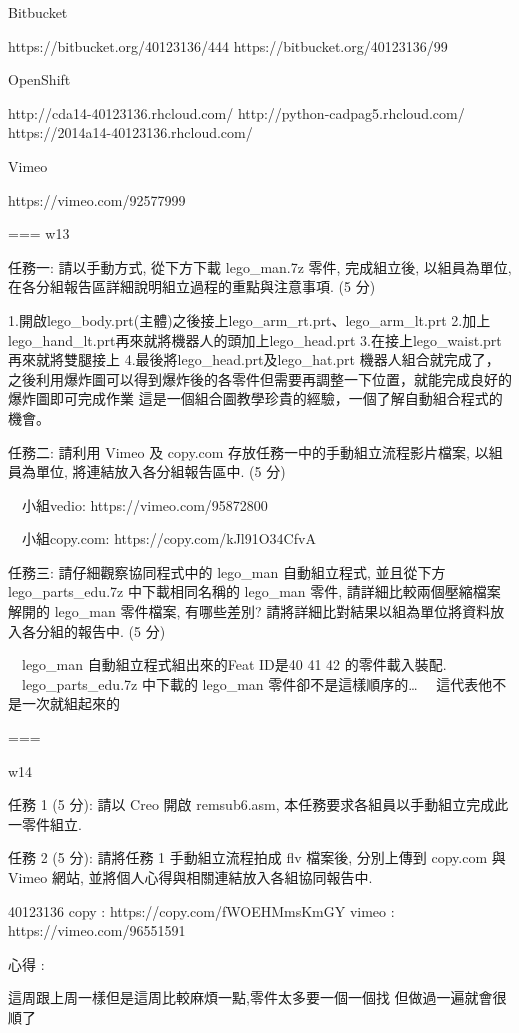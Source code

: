\documentclass[]{article}
\begin{document}
Bitbucket

https://bitbucket.org/40123136/444 https://bitbucket.org/40123136/99

OpenShift

http://cda14-40123136.rhcloud.com/ http://python-cadpag5.rhcloud.com/
https://2014a14-40123136.rhcloud.com/

Vimeo

https://vimeo.com/92577999

=== w13

任務一: 請以手動方式, 從下方下載 lego\_man.7z 零件, 完成組立後,
以組員為單位, 在各分組報告區詳細說明組立過程的重點與注意事項. (5 分)

1.開啟lego\_body.prt(主體)之後接上lego\_arm\_rt.prt、lego\_arm\_lt.prt
2.加上lego\_hand\_lt.prt再來就將機器人的頭加上lego\_head.prt
3.在接上lego\_waist.prt再來就將雙腿接上
4.最後將lego\_head.prt及lego\_hat.prt 機器人組合就完成了，
之後利用爆炸圖可以得到爆炸後的各零件但需要再調整一下位置，就能完成良好的爆炸圖即可完成作業
這是一個組合圖教學珍貴的經驗，一個了解自動組合程式的機會。

任務二: 請利用 Vimeo 及 copy.com 存放任務一中的手動組立流程影片檔案,
以組員為單位, 將連結放入各分組報告區中. (5 分)

　小組vedio: https://vimeo.com/95872800

　小組copy.com: https://copy.com/kJl91O34CfvA

任務三: 請仔細觀察協同程式中的 lego\_man 自動組立程式, 並且從下方
lego\_parts\_edu.7z 中下載相同名稱的 lego\_man 零件,
請詳細比較兩個壓縮檔案解開的 lego\_man 零件檔案, 有哪些差別?
請將詳細比對結果以組為單位將資料放入各分組的報告中. (5 分)

　lego\_man 自動組立程式組出來的Feat ID是40 41 42 的零件載入裝配.
　lego\_parts\_edu.7z 中下載的 lego\_man 零件卻不是這樣順序的\ldots{}
　這代表他不是一次就組起來的

===

w14

任務 1 (5 分): 請以 Creo 開啟 remsub6.asm,
本任務要求各組員以手動組立完成此一零件組立.

任務 2 (5 分): 請將任務 1 手動組立流程拍成 flv 檔案後, 分別上傳到
copy.com 與 Vimeo 網站, 並將個人心得與相關連結放入各組協同報告中.

40123136 copy : https://copy.com/fWOEHMmsKmGY vimeo :
https://vimeo.com/96551591

心得 :

這周跟上周一樣但是這周比較麻煩一點,零件太多要一個一個找
但做過一遍就會很順了
\end{document}
